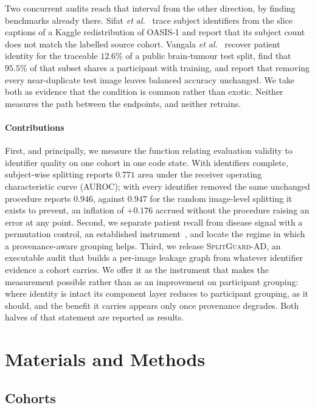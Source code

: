 \documentclass[pdflatex,sn-vancouver-num]{sn-jnl}
\newcommand{\SGA}{\textsc{SplitGuard-AD}}
\newcommand{\etal}{\textit{et al.}}
\begin{document}
Two concurrent audits reach that interval from the other direction, by finding
benchmarks already there. Sifat \etal~\cite{aljuhani2026leakageaware} trace
subject identifiers from the slice captions of a Kaggle redistribution of
OASIS-1 and report that its subject count does not match the labelled source
cohort. Vangala \etal~\cite{scoresthathold2026} recover patient identity for the
traceable $12.6\%$ of a public brain-tumour test split, find that $95.5\%$ of
that subset shares a participant with training, and report that removing every
near-duplicate test image leaves balanced accuracy unchanged. We take both as
evidence that the condition is common rather than exotic. Neither measures the
path between the endpoints, and neither retrains.

\paragraph{Contributions}
First, and principally, we measure the function relating evaluation validity to
identifier quality on one cohort in one code state. With identifiers complete,
subject-wise splitting reports $0.771$ area under the receiver operating
characteristic curve (AUROC); with every identifier removed the same unchanged
procedure reports $0.946$, against $0.947$ for the random image-level splitting
it exists to prevent, an inflation of $+0.176$ accrued without the procedure
raising an error at any point. Second, we separate patient recall from disease
signal with a permutation control, an established
instrument~\cite{chaibubneto2017permutation}, and locate the regime in which a
provenance-aware grouping helps. Third, we release \SGA{}, an executable audit
that builds a per-image leakage graph from whatever identifier evidence a cohort
carries. We offer it as the instrument that makes the measurement possible
rather than as an improvement on participant grouping: where identity is intact
its component layer reduces to participant grouping, as it should, and the
benefit it carries appears only once provenance degrades. Both halves of that
statement are reported as results.

\section{Materials and Methods}
\label{sec:methods}

\subsection{Cohorts}
\label{sec:cohorts}
\end{document}
